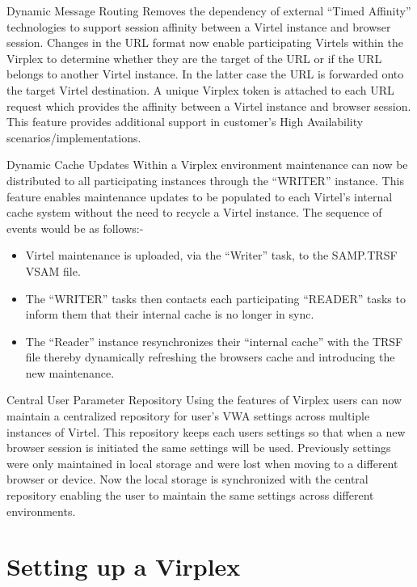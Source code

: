 \documentclass[letterpaper,10pt,english]{sphinxmanual}
\begin{document}
Dynamic Message Routing
Removes the dependency of external “Timed Affinity” technologies to support session affinity between a Virtel instance and browser session. Changes in the URL format now enable participating Virtels within the Virplex to determine whether they are the target of the URL or if the URL belongs to another Virtel instance. In the latter case the URL is forwarded onto the target Virtel destination. A unique Virplex token is attached to each URL request which provides the affinity between a Virtel instance and browser session. This feature provides additional support in customer’s High Availability scenarios/implementations.

Dynamic Cache Updates
Within a Virplex environment maintenance can now be distributed to all participating instances through the “WRITER” instance. This feature enables maintenance updates to be populated to each Virtel’s internal cache system without the need to recycle a Virtel instance. The sequence of events would be as follows:-
\begin{itemize}
\item {} 
Virtel maintenance is uploaded, via the “Writer” task, to the SAMP.TRSF VSAM file.

\item {} 
The “WRITER” tasks then contacts each participating “READER” tasks to inform them that their internal cache is no longer in sync.

\item {} 
The “Reader” instance resynchronizes their “internal cache” with the TRSF file thereby dynamically refreshing the browsers cache and introducing the new maintenance.

\end{itemize}

Central User Parameter Repository
Using the features of Virplex users can now maintain a centralized repository for user’s VWA settings across multiple instances of Virtel. This repository keeps each users settings so that when a new browser session is initiated the same settings will be used. Previously settings were only maintained in local storage and were lost when moving to a different browser or device. Now the local storage is synchronized with the central repository enabling the user to maintain the same settings across different environments.


\section{Setting up a Virplex}
\label{\detokenize{connectivity_guide:setting-up-a-virplex}}
\end{document}
